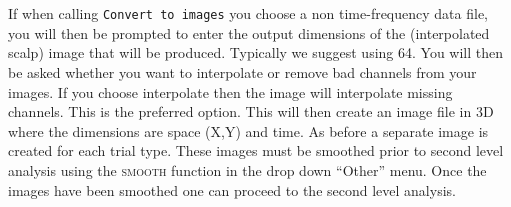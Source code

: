 \\
\\
If when calling \texttt{Convert to images} you choose a non time-frequency data file, you will then be prompted to enter the output dimensions of the (interpolated scalp)  image that will be produced. Typically we suggest using 64. You will then be asked whether you want to interpolate or remove bad channels from your images. If you choose interpolate then the image will interpolate missing channels. This is the preferred option.  This will then create an image file in 3D where the dimensions are space (X,Y) and time. As before a separate image is created for each trial type. These images must be smoothed prior to second level analysis using the \textsc{smooth} function in the drop down ``Other'' menu. Once the images have been smoothed one can proceed to the second level analysis.
